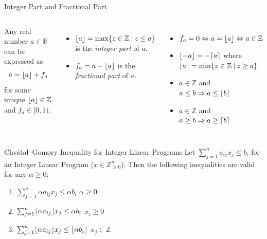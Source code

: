 \begin{frame}{Integer Part and Fractional Part}
\begin{columns}

Any real number $a \in \mathbb{R}$ can be expressed as
\begin{equation*}
a = \lfloor a\rfloor + f_a
\end{equation*}
for some unique $\lfloor a\rfloor \in \mathbb{Z}$ and $f_a \in [0,1)$.
\begin{itemize}
\item $\lfloor a\rfloor = \max\{z \in \mathbb{Z} \:\vert\: z \leq a\}$ is the\newline
\emph{integer part} of $a$.
\item $f_a = a - \lfloor a\rfloor$ is the\newline
\emph{fractional part} of $a$.
\end{itemize}


\begin{itemize}[<+(1)->]
	\item $f_a = 0 \Leftrightarrow a=\lfloor a\rfloor \Leftrightarrow a \in \mathbb{Z}$
	\item $\lfloor-a\rfloor = -\lceil a\rceil$ where $\lceil a\rceil = \min\{z \in \mathbb{Z} \:\vert\: z \geq a\}$
	\item $a \in \mathbb{Z}$ and $a \leq b \Rightarrow a \leq \lfloor b\rfloor$
	\item $a \in \mathbb{Z}$ and $a \geq b \Rightarrow a \geq \lceil b\rceil$
	\end{itemize}

\end{columns}
\end{frame}

\begin{frame}{Chvátal–Gomory Inequality for Integer Linear Programs}
Let $\sum_{j=1}^n a_{ij} x_j \leq b_i$ for an Integer Linear Program ($x \in \mathbb{Z}_{\geq 0}^n$).
Then the following inequalities are valid for any $\alpha \geq 0$:
\begin{enumerate}[<+->]
	\item $\sum_{j=1}^n \alpha a_{ij} x_j \leq \alpha b_i$ \hfill $\alpha \geq 0$
	\item $\sum_{j=1}^n \lfloor\alpha a_{ij}\rfloor x_j \leq \alpha b_i$ \hfill $x_j \geq 0$
	\item $\sum_{j=1}^n \lfloor\alpha a_{ij}\rfloor x_j \leq \lfloor \alpha b_i\rfloor$ \hfill $x_j \in \mathbb{Z}$
\end{enumerate}

\end{frame}

